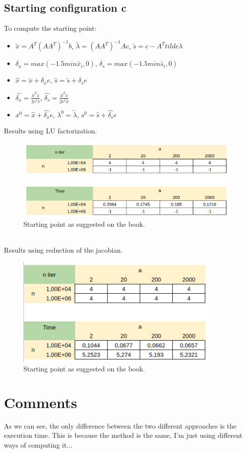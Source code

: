 \documentclass[]{article}
\begin{document}
\subsection{Starting configuration c}
To compute the starting point:
\begin{itemize}
	\item $\tilde{x} = A^T(AA^T)^{-1}b$, $\tilde{\lambda} = (AA^T)^{-1}Ac$, $\tilde{s} = c-A^Ttilde{\lambda}$
	\item $\delta_x=max(-1.5min\tilde{x_i},0)$, $\delta_s=max(-1.5min\tilde{s_i},0)$
	\item $\hat{x} = \tilde{x} + \delta_xe$, $\hat{s} = \tilde{s} + \delta_se$
	\item $\hat{\delta_x}=\frac{\hat{x}^T\hat{s}}{2e^t\hat{s}}$, $\hat{\delta_s}=\frac{\hat{x}^T\hat{s}}{2e^t\hat{x}}$
	\item $x^0 = \hat{x} + \hat{\delta_x}e$, $\lambda^0=\tilde{\lambda}$, $s^0 = \hat{s} + \hat{\delta_s}e$
\end{itemize}
Results using LU factorization.\\
\begin{figure}[h]
	\includegraphics[width=12cm]{table4.png}
	\caption{Starting point as suggested on the book.}
\end{figure}\\
Results using reduction of the jacobian.
\begin{figure}[h]
	\includegraphics[width=10cm]{table1.png}
	\caption{Starting point as suggested on the book.}
\end{figure}
\pagebreak
\section{Comments}
As we can see, the only difference between the two different approaches is the execution time. This is because the method is the same, I'm just using different ways of computing it...
\end{document}

